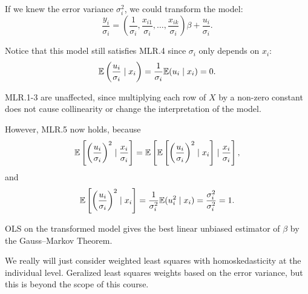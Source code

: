 \begin{proposition}
	If we knew the error variance $\sigma_i^2$, we could transform the model: \[
		\frac{y_i}{\sigma_i} = \left( \frac{1}{\sigma_i}, \frac{x_{i1}}{\sigma_i}, \ldots, \frac{x_{ik}}{\sigma_i} \right) \beta + \frac{u_i}{\sigma_i}
	.\] 

Notice that this model still satisfies MLR.4 since $\sigma_i$ only depends on $x_i$: \[
	\mathbb{E}\left( \frac{u_i}{\sigma_i} \mid x_i \right) = \frac{1}{\sigma_i} \mathbb{E}(u_i \mid x_i) = 0
.\] 

MLR.1-3 are unaffected, since multiplying each row of $X$ by a non-zero constant does not cause collinearity or change the interpretation of the model.

However, MLR.5 now holds, because \[
	\mathbb{E}\left[ \left( \frac{u_i}{\sigma_i} \right)^2 \mid \frac{x_i}{\sigma_i} \right] = \mathbb{E}\left[ \mathbb{E}\left[ \left( \frac{u_i}{\sigma_i} \right)^2 \mid x_i \right] \mid \frac{x_i}{\sigma_i} \right]
,\] and \[
	\mathbb{E}\left[ \left( \frac{u_i}{\sigma_i} \right)^2 \mid x_i \right] = \frac{1}{\sigma_i^2} \mathbb{E}(u_i^2 \mid x_i) = \frac{\sigma_i^2}{\sigma_i^2} = 1
.\] 

	OLS on the transformed model gives the best linear unbiased estimator of $\beta$ by the Gauss--Markov Theorem.
\end{proposition}

We really will just consider weighted least squares with homoskedasticity at the individual level. Geralized least squares weights based on the error variance, but this is beyond the scope of this course.

